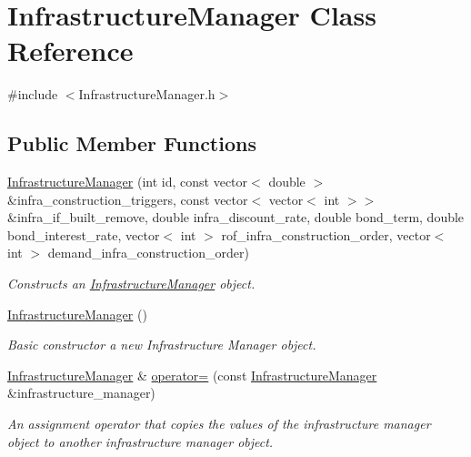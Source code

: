 \hypertarget{classInfrastructureManager}{}\section{Infrastructure\+Manager Class Reference}
\label{classInfrastructureManager}


{\ttfamily \#include $<$Infrastructure\+Manager.\+h$>$}

\subsection*{Public Member Functions}
\begin{DoxyCompactItemize}
\item 
\mbox{\hyperlink{classInfrastructureManager_a2720f467b660e0f63f265e7957ca0139}{Infrastructure\+Manager}} (int id, const vector$<$ double $>$ \&infra\+\_\+construction\+\_\+triggers, const vector$<$ vector$<$ int $>$$>$ \&infra\+\_\+if\+\_\+built\+\_\+remove, double infra\+\_\+discount\+\_\+rate, double bond\+\_\+term, double bond\+\_\+interest\+\_\+rate, vector$<$ int $>$ rof\+\_\+infra\+\_\+construction\+\_\+order, vector$<$ int $>$ demand\+\_\+infra\+\_\+construction\+\_\+order)
\begin{DoxyCompactList}\small\item\em Constructs an \mbox{\hyperlink{classInfrastructureManager}{Infrastructure\+Manager}} object. \end{DoxyCompactList}\item 
\mbox{\hyperlink{classInfrastructureManager_a435ec4cb56238c6e1d93e37783f3a03a}{Infrastructure\+Manager}} ()
\begin{DoxyCompactList}\small\item\em Basic constructor a new Infrastructure Manager object. \end{DoxyCompactList}\item 
\mbox{\hyperlink{classInfrastructureManager}{Infrastructure\+Manager}} \& \mbox{\hyperlink{classInfrastructureManager_ad016a00ca49b1896e94a04f723209a64}{operator=}} (const \mbox{\hyperlink{classInfrastructureManager}{Infrastructure\+Manager}} \&infrastructure\+\_\+manager)
\begin{DoxyCompactList}\small\item\em An assignment operator that copies the values of the infrastructure manager object to another infrastructure manager object. \end{DoxyCompactList}\item 
$$
\end{DoxyCompactItemize}
